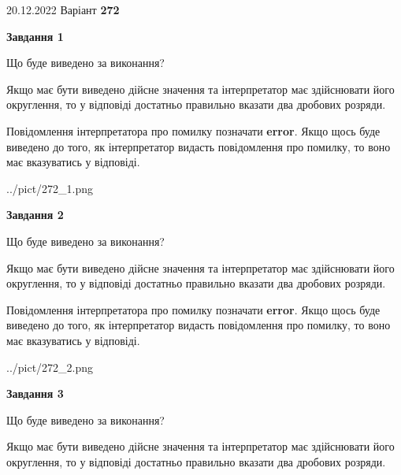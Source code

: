 \documentclass[12pt, ukrainian]{article}
\begin{document}
{20.12.2022 Варіант \No \textbf { 272 }\par}
{
\begin {Large}

{\begin {center}\textbf{Завдання 1}\end {center}}\par
Що буде виведено за виконання? \par

Якщо має бути виведено дійсне значення та інтерпретатор має здійснювати його округлення, 
то у відповіді достатньо правильно вказати два дробових розряди.

Повідомлення інтерпретатора про помилку позначати \textbf{error}.
Якщо щось буде виведено до того, як інтерпретатор видасть повідомлення про помилку, 
то воно має вказуватись у відповіді. \par

\begin{center}
	{../pict/272_1.png}
\end{center}
\newpage

{\begin {center}\textbf{Завдання 2}\end {center}}\par
Що буде виведено за виконання? \par

Якщо має бути виведено дійсне значення та інтерпретатор має здійснювати його округлення, 
то у відповіді достатньо правильно вказати два дробових розряди.

Повідомлення інтерпретатора про помилку позначати \textbf{error}.
Якщо щось буде виведено до того, як інтерпретатор видасть повідомлення про помилку, 
то воно має вказуватись у відповіді. \par

\begin{center}
	{../pict/272_2.png}
\end{center}
\newpage

{\begin {center}\textbf{Завдання 3}\end {center}}\par
Що буде виведено за виконання? \par

Якщо має бути виведено дійсне значення та інтерпретатор має здійснювати його округлення, 
то у відповіді достатньо правильно вказати два дробових розряди.


\end{Large}}
\end{document}
